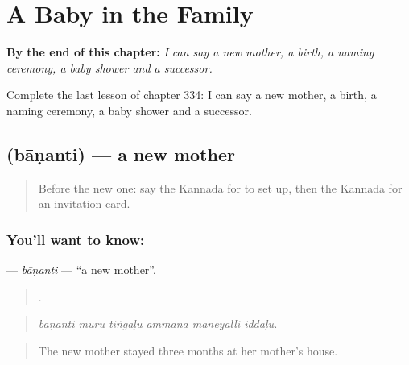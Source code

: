 
\chapter{A Baby in the Family}
\label{ch:ka-a-baby-in-the-family}

\begin{chapteropening}
\textbf{By the end of this chapter:} \emph{I can say a new mother, a birth, a naming ceremony, a baby shower and a successor.}

Complete the last lesson of chapter 334: I can say a new mother, a birth, a naming ceremony, a baby shower and a successor.
\end{chapteropening}

\section[\texorpdfstring{\kn{ಬಾಣಂತಿ} (bāṇanti)}{ಬಾಣಂತಿ (bāṇanti)}]{ (bāṇanti) — a new mother}

\label{lesson:KA-C334-bananti}



\begin{quote}
Before the new one: say the Kannada for to set up, then the Kannada for an invitation card.
\end{quote}

\subsection*{You'll want to know: }
\textbf{} — \emph{bāṇanti} — \textquotedblleft{}a new mother\textquotedblright{}.

\begin{quote}
     .
\end{quote}

\begin{quote}
\emph{bāṇanti mūru tiṅgaḷu ammana maneyalli iddaḷu.}
\end{quote}

\begin{quote}
The new mother stayed three months at her mother's house.
\end{quote}

